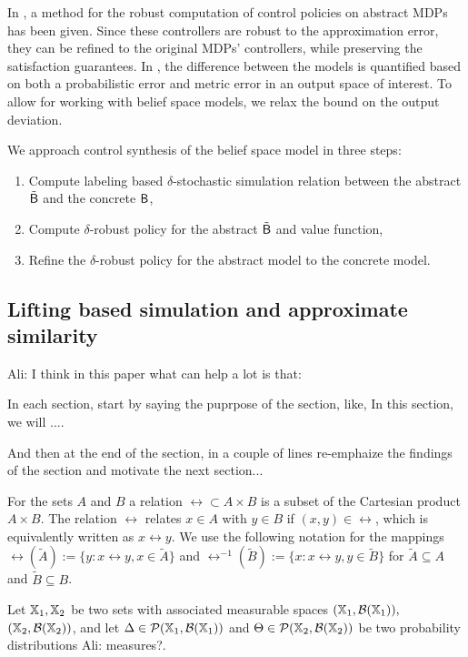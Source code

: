 \documentclass{ifacconf}
\renewcommand{\axx}[1]{{\color{orange} Ali: #1}}
\begin{document}
In \citet{tech_report_TACAS}, a method for the robust computation of control policies on abstract MDPs has been given.  Since these controllers are robust to the approximation error,  they can be refined to the original MDPs' controllers, while preserving the satisfaction guarantees. 
In \citet{tech_report_TACAS}, the difference between the models is quantified based on both a probabilistic error and metric error in an output space of interest. 
To allow for working with belief space models, we relax the bound on the output deviation.


We approach control synthesis of the belief space model in three steps:
\begin{enumerate}
\item Compute labeling based $\delta$-stochastic  simulation relation between  the abstract $\tilde{\mathsf{B}}$ and the concrete $\mathsf{B}$,
\item Compute $\delta$-robust policy for the abstract $\tilde{\mathsf{B}}$ and value function,
\item Refine the $\delta$-robust policy for the abstract model to the concrete model.
\end{enumerate}

\subsection{Lifting based simulation  and approximate similarity}
\axx{I think in this paper what can help a lot is that:

In each section, start by saying the puprpose of the section, like, In this section, we will ....

And then at the end of the section, in a couple of lines re-emphaize the findings of the section and motivate the next section...

}

For the sets $A$ and $B$ a relation $\rel\subset A\times B$ is a subset of the Cartesian product $A\times B$. The relation $\rel$ relates $x\in A$ with $y\in B$ if $(x,y)\in\rel$, which is equivalently written as $x\rel y$. 
We use the following notation for the mappings  $\rel(\tilde A):=\{y: x\rel y, x\in \tilde A\}$ and  $\rel^{-1}( \tilde B):=\{x: x\rel y, y\in \tilde B\}$ for   $\tilde A\subseteq A$ and $\tilde B \subseteq B$.

	Let ${\mathbb{X}}_1,{\mathbb{X}}_2$ be two sets with associated measurable spaces $({\mathbb{X}}_1,\mathcal B({\mathbb{X}}_1)),$ $({\mathbb{X}}_2,\mathcal B({\mathbb{X}}_2))$,
	and let   $\Delta\in \mathcal{P}({\mathbb{X}}_1,\mathcal B({\mathbb{X}}_1)) $ and  $\Theta\in \mathcal{P}({\mathbb{X}}_2,\mathcal B({\mathbb{X}}_2)) $ be two probability distributions \axx{measures?}. 
%	
\end{document}
